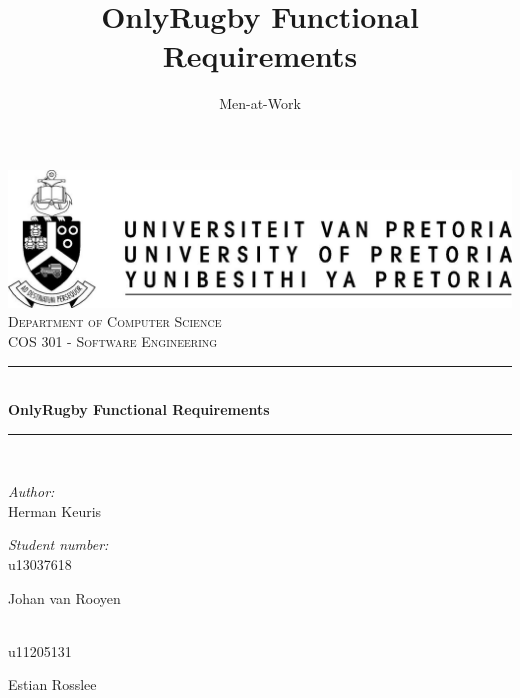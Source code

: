 \documentclass[a4paper,12pt]{report}
\author{Men-at-Work}
\title{ OnlyRugby Functional Requirements}
\newcommand{\HRule}{\rule{\linewidth}{0.5mm}}
\begin{document}
\setlength{\parskip}{6pt}

\begin{titlepage}

\begin{center}
\includegraphics[width=1\textwidth]{./up-logo.jpg}\\[0.4cm]    
\textsc{\LARGE Department of Computer Science}\\[1.5cm]
\textsc{\Large COS 301 - Software Engineering}\\[0.5cm]
\HRule \\[0.4cm]
{ \huge \bfseries OnlyRugby Functional Requirements}\\[0.4cm]
\HRule \\[0.4cm]
\begin{minipage}{0.4\textwidth}
\begin{flushleft} \large
\emph{Author:}\\
Herman {Keuris}
\end{flushleft}
\end{minipage}
\begin{minipage}{0.4\textwidth}
\begin{flushright} \large
\emph{Student number:} \\
u13037618
\end{flushright}
\end{minipage}
\begin{minipage}{0.4\textwidth}
\begin{flushleft} \large
Johan {van Rooyen}
\end{flushleft}
\end{minipage}
\begin{minipage}{0.4\textwidth}
\begin{flushright} \large
\emph{} \\
u11205131
\end{flushright}
\end{minipage}
\begin{minipage}{0.4\textwidth}
\begin{flushleft} \large
Estian {Rosslee}
\end{flushleft}

\end{minipage}
\end{center}
\end{titlepage}
\end{document}
